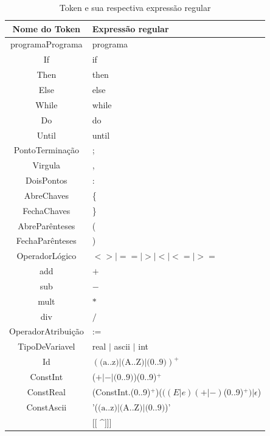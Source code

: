 \documentclass[11pt]{article}
\begin{document}
\begin{table}[H]
    \begin{tabularx}{\textwidth}{c|X}
        \hline
        \textbf{Nome do Token} & \textbf{Expressão regular}   \\ 
        \hline
        programaPrograma & programa  \\  
        \hline
        If  & if \\
        \hline
        Then & then  \\
        \hline
        Else & else \\
        \hline
        While  & while \\
        \hline
        Do & do \\
        \hline
        Until  & until \\
        \hline
        \hline
        PontoTerminação  & ; \\
        \hline
        Virgula  & , \\
        \hline
        DoisPontos  & : \\
        \hline
        AbreChaves  & \{ \\
        \hline
        FechaChaves  & \} \\
        \hline
        AbreParênteses  & ( \\
        \hline
        FechaParênteses  & ) \\
        \hline
        \hline
        OperadorLógico & $<> | == | > | < | <= | >= $   \\
        \hline
        add & $+$   \\
        \hline
        sub & $ - $   \\
        \hline
        mult & $ * $   \\
        \hline
        div & $ / $   \\
        \hline
        \hline
        OperadorAtribuição & := \\
        \hline
        \hline
        TipoDeVariavel & real $|$ ascii $|$ int \\  
        \hline
        \hline
        Id & $(\text{(a..z)}|\text{(A..Z)}|\text{(0..9)})^{+}$ \\
        \hline
        \hline
        ConstInt & ($+ | -| \text{(0..9)}$)(0..9)$^{+}$ \\
        \hline
        ConstReal & (ConstInt.(0..9)$^+$)($((E|e)(+|-)$(0..9)$^+) | \epsilon$)  \\
        \hline
        ConstAscii & '($\text{(a..z)}|\text{(A..Z)}|\text{(0..9)}$)' \\    
        \hline
        [\textit{comentário}] & [[ \^{}]]] \\
        \hline
    \end{tabularx}
    \caption{Token e sua respectiva expressão regular}
\end{table}
\end{document}
